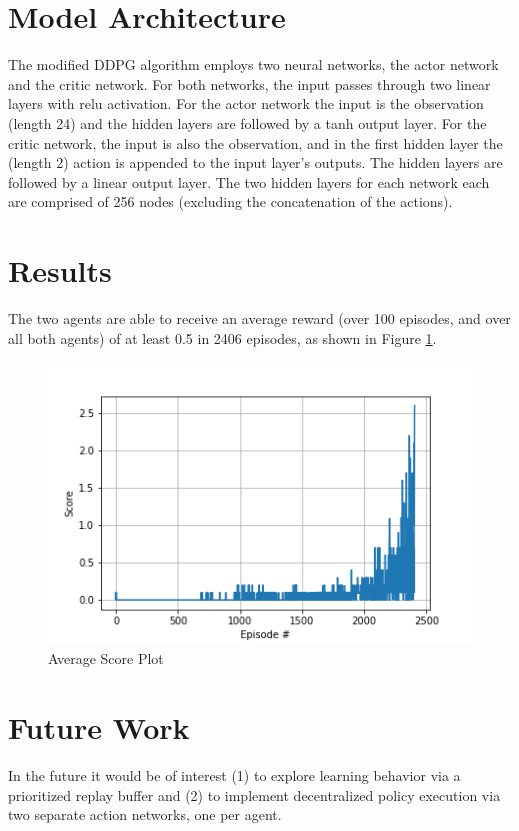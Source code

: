 \documentclass{article}
\begin{document}
\section{Model Architecture}
The modified DDPG algorithm employs two neural networks, the actor network and the critic network. For both networks, the input passes through two linear layers with relu activation. For the actor network the input is the observation (length 24) and the hidden layers are followed by a tanh output layer. For the critic network, the input is also the observation, and in the first hidden layer the (length 2) action is appended to the input layer's outputs. The hidden layers are followed by a linear output layer. The two hidden layers  for each network each are comprised of 256 nodes (excluding the concatenation of the actions).  

\section{Results}
The two agents are able to receive an average reward (over 100 episodes, and over all both agents) of at least 0.5 in 2406 episodes, as shown in Figure \ref{fig:results}.

\begin{figure}[ht]
\centering
\includegraphics[scale=0.75]{../implementation/figures/results.png}
\caption{Average Score Plot}
\label{fig:results}
\end{figure}

\section{Future Work}
In the future it would be of interest (1) to explore learning behavior via a prioritized replay buffer and (2) to implement decentralized policy execution via two separate action networks, one per agent. 



\end{document}
